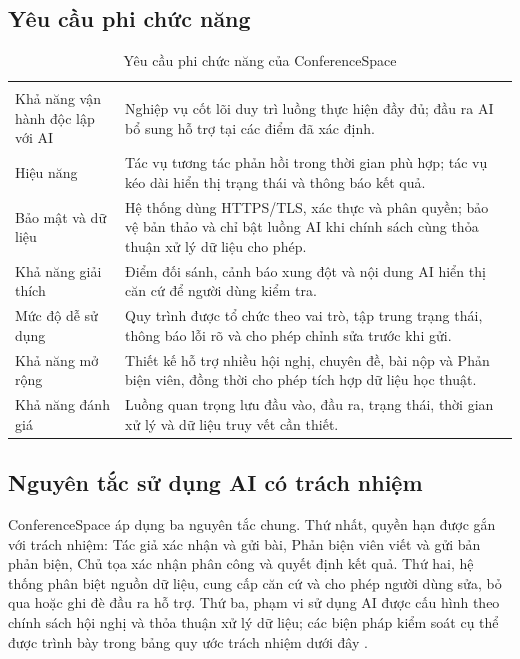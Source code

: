 \subsection{Yêu cầu phi chức năng}

\begingroup
\setlength{\tabcolsep}{2pt}
\setlength{\LTleft}{0pt plus \textwidth}
\setlength{\LTright}{0pt plus \textwidth}
\begin{longtable}{|P{0.25\textwidth}|P{0.69\textwidth}|}
  \caption{Yêu cầu phi chức năng của ConferenceSpace}\\
\hline
{} &  \\ \hline
\endfirsthead
\hline
{} &  \\ \hline
\endhead
\hline
\endfoot
Khả năng vận hành độc lập với AI & Nghiệp vụ cốt lõi duy trì luồng thực hiện đầy đủ; đầu ra AI bổ sung hỗ trợ tại các điểm đã xác định. \\ \hline
Hiệu năng & Tác vụ tương tác phản hồi trong thời gian phù hợp; tác vụ kéo dài hiển thị trạng thái và thông báo kết quả. \\ \hline
Bảo mật và dữ liệu & Hệ thống dùng HTTPS/TLS, xác thực và phân quyền; bảo vệ bản thảo và chỉ bật luồng AI khi chính sách cùng thỏa thuận xử lý dữ liệu cho phép. \\ \hline
Khả năng giải thích & Điểm đối sánh, cảnh báo xung đột và nội dung AI hiển thị căn cứ để người dùng kiểm tra. \\ \hline
Mức độ dễ sử dụng & Quy trình được tổ chức theo vai trò, tập trung trạng thái, thông báo lỗi rõ và cho phép chỉnh sửa trước khi gửi. \\ \hline
Khả năng mở rộng & Thiết kế hỗ trợ nhiều hội nghị, chuyên đề, bài nộp và Phản biện viên, đồng thời cho phép tích hợp dữ liệu học thuật. \\ \hline
Khả năng đánh giá & Luồng quan trọng lưu đầu vào, đầu ra, trạng thái, thời gian xử lý và dữ liệu truy vết cần thiết. \\ \hline
\end{longtable}
\endgroup

\subsection{Nguyên tắc sử dụng AI có trách nhiệm}

ConferenceSpace áp dụng ba nguyên tắc chung. Thứ nhất, quyền hạn được gắn với trách nhiệm: Tác giả xác nhận và gửi bài, Phản biện viên viết và gửi bản phản biện, Chủ tọa xác nhận phân công và quyết định kết quả. Thứ hai, hệ thống phân biệt nguồn dữ liệu, cung cấp căn cứ và cho phép người dùng sửa, bỏ qua hoặc ghi đè đầu ra hỗ trợ. Thứ ba, phạm vi sử dụng AI được cấu hình theo chính sách hội nghị và thỏa thuận xử lý dữ liệu; các biện pháp kiểm soát cụ thể được trình bày trong bảng quy ước trách nhiệm dưới đây \cite{ch2ref19}.

